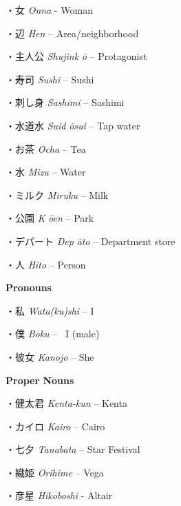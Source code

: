 \par{・女 \emph{On\textquotesingle na }- Woman }

\par{・辺 \emph{Hen }– Area\slash neighborhood }

\par{・主人公 \emph{Shujink }\emph{ō }– Protagonist }

\par{・寿司 \emph{Sushi }– Sushi }

\par{・刺し身 \emph{Sashimi }– Sashimi }

\par{・水道水 \emph{Suid }\emph{ōsui }– Tap water }

\par{・お茶 \emph{Ocha }– Tea }

\par{・水 \emph{Mizu }– Water }

\par{・ミルク \emph{Miruku }– Milk }

\par{・公園 \emph{K }\emph{ōen }– Park }

\par{・デパート \emph{Dep }\emph{āto }– Department store }

\par{・人 \emph{Hito }– Person }

\par{\textbf{Pronouns }}

\par{・私 \emph{Wata(ku)shi }– I }

\par{・僕 \emph{Boku }–  I (male) }

\par{・彼女 \emph{Kanojo }– She }

\par{\textbf{Proper Nouns }}

\par{・健太君 \emph{Kenta-kun }– Kenta }

\par{・カイロ \emph{Kairo }– Cairo }

\par{・七夕 \emph{Tanabata }– Star Festival }

\par{・織姫 \emph{Orihime }– Vega }

\par{・彦星 \emph{Hikoboshi }- Altair }

